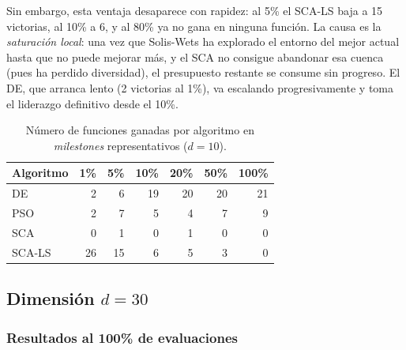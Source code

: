 \documentclass[12pt,a4paper]{article}
\begin{document}
Sin embargo, esta ventaja desaparece con rapidez: al 5\% el SCA-LS baja a 15 victorias, al 10\% a 6, y al 80\% ya no gana en ninguna función. La causa es la \textit{saturación local}: una vez que Solis-Wets ha explorado el entorno del mejor actual hasta que no puede mejorar más, y el SCA no consigue abandonar esa cuenca (pues ha perdido diversidad), el presupuesto restante se consume sin progreso. El DE, que arranca lento (2 victorias al 1\%), va escalando progresivamente y toma el liderazgo definitivo desde el 10\%.

\begin{table}[H]
\centering
\caption{Número de funciones ganadas por algoritmo en \textit{milestones} representativos ($d=10$).}
\label{tab:resumen_victorias_sca_ls_d10}
\renewcommand{\arraystretch}{1.2}
\begin{tabular}{lrrrrrr}
\toprule
\textbf{Algoritmo} & \textbf{1\%} & \textbf{5\%} & \textbf{10\%} & \textbf{20\%} & \textbf{50\%} & \textbf{100\%} \\
\midrule
DE      &  2 &  6 & 19 & 20 & 20 & 21 \\
PSO     &  2 &  7 &  5 &  4 &  7 &  9 \\
SCA     &  0 &  1 &  0 &  1 &  0 &  0 \\
SCA-LS  & 26 & 15 &  6 &  5 &  3 &  0 \\
\bottomrule
\end{tabular}
\end{table}

\subsection{Dimensión $d = 30$}

\subsubsection{Resultados al 100\% de evaluaciones}
\end{document}

